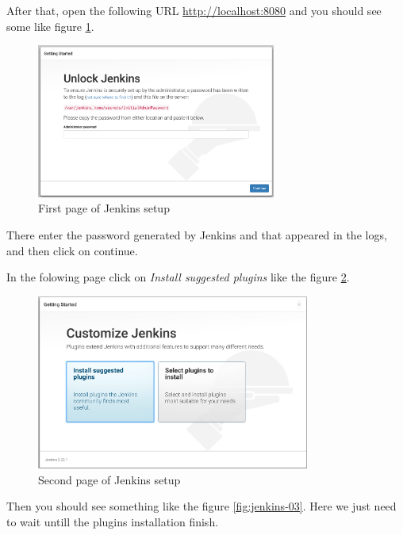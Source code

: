 After that, open the following URL \url{http://localhost:8080} and you should see some like figure \ref{fig:jenkins-01}.

\begin{figure}[H]
	\centering
    \includegraphics[width=0.7\textwidth]{grafiken/jenkins-01}
    \caption{First page of Jenkins setup}
    \label{fig:jenkins-01}
\end{figure}

There enter the password generated by Jenkins and that appeared in the logs, and then click on continue.

In the folowing page click on \textit{Install suggested plugins} like the figure \ref{fig:jenkins-02}.

\begin{figure}[H]
	\centering
    \includegraphics[width=0.8\textwidth]{grafiken/jenkins-02}
    \caption{Second page of Jenkins setup}
    \label{fig:jenkins-02}
\end{figure}

Then you should see something like the figure \ref{fig:jenkins-03}. Here we just need to wait untill the plugins installation finish.

